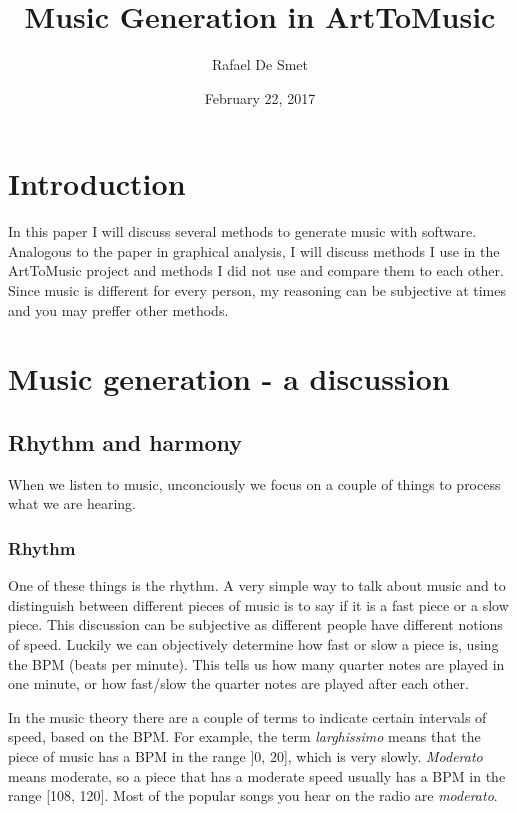 \documentclass[12pt]{article}
\begin{document}
\title{Music Generation in ArtToMusic}
\date{February 22, 2017}
\author{Rafael De Smet}

\maketitle
\tableofcontents

\section{Introduction}

In this paper I will discuss several methods to generate music with software. Analogous to the paper in graphical analysis, I will discuss methods I use in the ArtToMusic project and methods I did not use and compare them to each other. Since music is different for every person, my reasoning can be subjective at times and you may preffer other methods. 

\section{Music generation - a discussion}

\subsection{Rhythm and harmony}

When we listen to music, unconciously we focus on a couple of things to process what we are hearing.

\subsubsection{Rhythm}

One of these things is the rhythm. A very simple way to talk about music and to distinguish between different pieces of music is to say if it is a fast piece or a slow piece. This discussion can be subjective as different people have different notions of speed. Luckily we can objectively determine how fast or slow a piece is, using the BPM (beats per minute).
This tells us how many quarter notes are played in one minute, or how fast/slow the quarter notes are played after each other.
\newline

In the music theory there are a couple of terms to indicate certain intervals of speed, based on the BPM. For example, the term \textit{larghissimo} means that the piece of music has a BPM in the range ]0, 20], which is very slowly. \textit{Moderato} means moderate, so a piece that has a moderate speed usually has a BPM in the range [108, 120]. Most of the popular songs you hear on the radio are \textit{moderato}.
\end{document}

